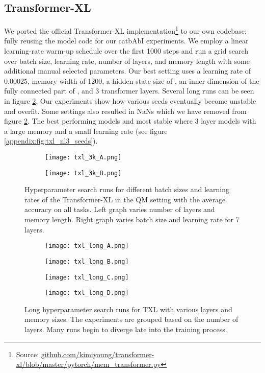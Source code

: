 \documentclass{article} \usepackage{iclr2021_conference,times}
\begin{document}
\subsection{Transformer-XL}
We ported the official Transformer-XL implementation\footnote{Source: \url{github.com/kimiyoung/transformer-xl/blob/master/pytorch/mem_transformer.py}} to our own codebase; fully reusing the model code for our catbAbI experiments. We employ a linear learning-rate warm-up schedule over the first 1000 steps and run a grid search over batch size, learning rate, number of layers, and memory length with some additional manual selected parameters. Our best setting uses a learning rate of 0.00025, memory width of 1200, a hidden state size of , an inner dimension of the fully connected part of , and 3 transformer layers. Several long runs can be seen in figure \ref{appendix:fig:txl_long}. Our experiments show how various seeds eventually become unstable and overfit. Some settings also resulted in NaNs which we have removed from figure \ref{appendix:fig:txl_long}. The best performing models and most stable where 3 layer models with a large memory and a small learning rate (see figure \ref{appendix:fig:txl_nl3_seeds}).
\begin{figure}[H]
  \centering
  \vspace{-10pt}
  \begin{subfigure}[b]{.49\linewidth}
    \texttt{[image: txl\_3k\_A.png]}
  \end{subfigure}
  \begin{subfigure}[b]{.49\linewidth}
    \texttt{[image: txl\_3k\_B.png]}
  \end{subfigure}
  \caption{Hyperparameter search runs for different batch sizes and learning rates of the Transformer-XL in the QM setting with the average accuracy on all tasks. Left graph varies number of layers and memory length. Right graph varies batch size and learning rate for 7 layers.}
  \label{appendix:fig:txl3k}
\end{figure}

\begin{figure}[H]
  \centering
  \vspace{-10pt}
  \begin{subfigure}[b]{.49\linewidth}
    \texttt{[image: txl\_long\_A.png]}
  \end{subfigure}
  \begin{subfigure}[b]{.49\linewidth}
    \texttt{[image: txl\_long\_B.png]}
  \end{subfigure}
  \begin{subfigure}[b]{.49\linewidth}
    \texttt{[image: txl\_long\_C.png]}
  \end{subfigure}
  \begin{subfigure}[b]{.49\linewidth}
    \texttt{[image: txl\_long\_D.png]}
  \end{subfigure}
  \caption{Long hyperparameter search runs for TXL with various layers and memory sizes. The experiments are grouped based on the number of layers. Many runs begin to diverge late into the training process.}
  \label{appendix:fig:txl_long}
\end{figure}
\end{document}
